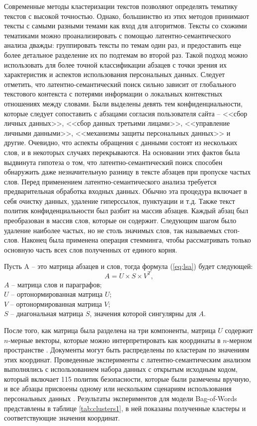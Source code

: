 \documentclass[../main]{subfiles}
\begin{document}
Современные методы кластеризации текстов позволяют определять тематику текстов с высокой точностью. Однако, большинство из этих методов принимают тексты с самыми разными темами как вход для алгоритмов. Тексты со схожими тематиками можно проанализировать с помощью ла\-тен\-тно-семантического анализа дважды: группировать тексты по темам один раз, и предоставить еще более детальное разделение их по подтемам во второй раз. Такой подход можно использовать для более точной классификации абзацев с точки зрения их характеристик и аспектов использования персональных данных. Следует отметить, что латентно-семантический поиск сильно зависит от глобального текстового контекста с потерями информации о локальных контекстных отношениях между словами. Были выделены девять тем конфиденциальности, которые следует сопоставить с абзацами согласия пользователя сайта -- <<сбор личных данных>>, <<сбор данных третьими лицами>>, <<управление личными данными>>, <<механизмы защиты персональных данных>> и другие. Очевидно, что аспекты обращения с данными состоят из нескольких слов, и в некоторых случаях перекрываются. На основании этих фактов была выдвинута гипотеза о том, что латентно-семантический поиск способен обнаружить даже незначительную разницу в тексте абзацев при пропуске частых слов. Перед применением латентно-семантического анализа требуется предварительная обработка входных данных. Обычно эта процедура включает в себя очистку данных, удаление гиперссылок, пунктуации и т.д. Также текст политик конфиденциальности был разбит на массив абзацев. Каждый абзац был преобразован в массив слов, которые он содержит. Следующим шагом было удаление наиболее частых, но не столь значимых слов, так называемых стоп-слов. Наконец была применена операция стемминга, чтобы рассматривать только основную часть всех слов полученных от единого корня.

Пусть A -- это матрица абзацев и слов, тогда формула (\ref{eq:lsa}) будет следующей:
\begin{equation}
    \label{eq:lsa}
    A = U \times S \times V^T,
\end{equation}
$A$ -- матрица слов и параграфов;\\
\makebox[1.25cm]{\hfill}$U$ -- ортонормированная матрица $U$;\\
\makebox[1.25cm]{\hfill}$V$ -- ортонормированная матрица $V$;\\
\makebox[1.25cm]{\hfill}$S$ -- диагональная матрица $S$, значения которой сингулярны для $A$.

После того, как матрица была разделена на три компоненты, матрица $U$ содержит $n$-мерные векторы, которые можно интерпретировать как координаты в $n$-мерном пространстве \cite{LSA}. Документы могут быть распределены по кластерам по значениям этих координат. Проведенные эксперименты с латентно-семантическим анализом выполнялись с использованием набора данных с открытым исходным кодом, который включает 115 политик безопасности, которые были размечены вручную, и все абзацы присвоены одному или нескольким сценариям использования персональных данных \cite{MDPI18}. Результаты экспериментов для модели Bag-of-Words представлены в таблице \ref{tab:clusters1}, в ней показаны полученные кластеры и соответствующие значения координат.
\end{document}
